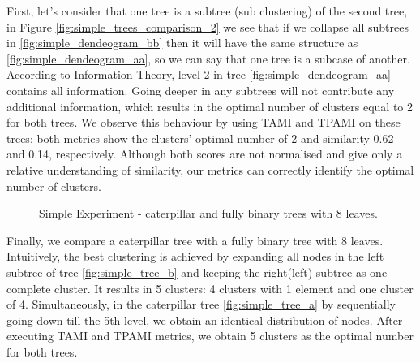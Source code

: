 First, let's consider that one tree is a subtree (sub clustering) of the second tree, in Figure \ref{fig:simple_trees_comparison_2} we see that if we collapse all subtrees in \ref{fig:simple_dendeogram_bb} then it will have the same structure as \ref{fig:simple_dendeogram_aa}, so we can say that one tree is a subcase of another. According to Information Theory, level 2 in tree \ref{fig:simple_dendeogram_aa} contains all information. Going deeper in any subtrees will not contribute any additional information, which results in the optimal number of clusters equal to 2 for both trees. We observe this behaviour by using TAMI and TPAMI on these trees: both metrics show the clusters' optimal number of 2 and similarity 0.62 and 0.14, respectively. Although both scores are not normalised and give only a relative understanding of similarity, our metrics can correctly identify the optimal number of clusters. 

\begin{figure}[H]
	\centering
	\caption{Simple Experiment - caterpillar and fully binary trees with 8 leaves.}
	\label{fig:simple_trees_comparison}
\end{figure}

Finally, we compare a caterpillar tree with a fully binary tree with 8 leaves. Intuitively, the best clustering is achieved by expanding all nodes in the left subtree of tree \ref{fig:simple_tree_b} and keeping the right(left) subtree as one complete cluster. It results in 5 clusters: 4 clusters with 1 element and one cluster of 4. Simultaneously, in the caterpillar tree \ref{fig:simple_tree_a} by sequentially going down till the 5th level, we obtain an identical distribution of nodes. After executing TAMI and TPAMI metrics, we obtain 5 clusters as the optimal number for both trees. 

